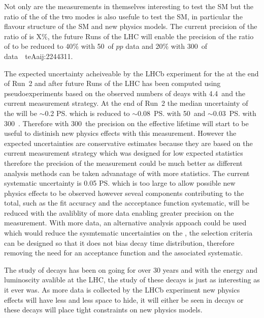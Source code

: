 Not only are the \BF measurements in themselves interesting to test the SM but the ratio of the \BFs of the two modes is also usefule to test the SM, in particular the flavour structure of the SM and new physics models. The current precision of the ratio of \BFs is X$\%$, the future Runs of the LHC will enable the precision of the ratio of \BFs to be reduced to 40$\%$ with 50~\fb of $pp$ data and 20$\%$ with 300~\fb of data~\ci\
te{Aaij:2244311}. 

The expected uncertainty acheiveable by the LHCb experiment for the \el at the end of Run~2 and after future Runs of the LHC has been computed using pseudoexperiments based on the observed numbers of deays with 4.4~\fb and the current measurement strategy. At the end of Run~2 the median uncertainty of the \el will be $\sim$0.2 \ps which is reduced to $\sim$0.08~\ps with 50~\fb and $\sim$0.03~\ps with 300~\fb. Therefore with 300~\fb the precision on the effective lifetime will start to be useful to distinish new physics effects with this measurement. However the expected uncertainties are conservative estimates because they are based on the current measurement strategy which was designed for low expected statistics therefore the precision of the measurement could be much better as different analysis methods can be taken advanatage of with more statistics. 
The current systematic uncertainty is 0.05 \ps which is too large to allow possible new physics effects to be observed however seveal components contributing to the total, such as the fit accuracy and the accceptance function systematic, will be reduced with the avaliblity of more data enabling greater precision on the measurement. With more data, an alternative analysis appoach could be used which would reduce the sysmtematic uncertainties on the \el, the selection criteria can be designed so that it does not bias \bsmumu decay time distribution, therefore removing the need for an acceptance function and the associated systematic.


The study of \bmumu decays has been on going for over 30 years and with the energy and luminoscity avalible at the LHC, the study of these decays is just as interesting as it ever was. As more data is collected by the LHCb experiment new physics effects will have less and less space to hide, it will either be seen in \bmumu decays or these decays will place tight constraints on new physics models. 
